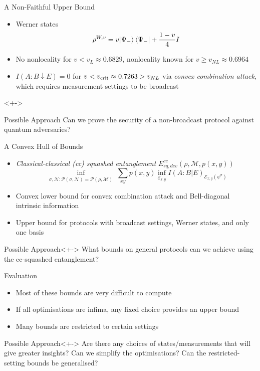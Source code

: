 \documentclass[xcolor=dvipsnames]{beamer}
\newcommand{\?}{\mathrel{?}} %
\newcommand{\sM}{\mathcal{M}}
\newcommand{\sN}{\mathcal{N}}
\newcommand{\cE}{\mathcal{E}}
\newcommand{\cP}{\mathcal{P}}
\newcommand{\crit}{\rm crit}
\begin{document}

\begin{frame}{A Non-Faithful Upper Bound}
  \begin{itemize}[<+->]
    \item Werner states
      \[ \rho^{W,v} = v{\ket{\Psi_-}\bra{\Psi_-}} + \frac{1-v}{4}I \]
    \item No nonlocality for \(v < v_L \approx 0.6829\), nonlocality known for \(v \geq v_{NL} \approx 0.6964\)
    \item \(I(A:B \downarrow E) = 0\) for \(v < v_{\crit} \approx 0.7263 > v_{NL}\) via \emph{convex combination attack}, which requires measurement settings to be broadcast
  \end{itemize}

  \begin{onlyenv}<+->
    \begin{block}{Possible Approach}
      Can we prove the security of a non-broadcast protocol against quantum adversaries?
    \end{block}
  \end{onlyenv}
\end{frame}

\begin{frame}{A Convex Hull of Bounds}
  \begin{itemize}[<+->]
    \item \emph{Classical-classical (cc) squashed entanglement} \(E^{cc}_{sq,dev}(\rho, \sM, p(x,y))\)
      \[ \inf_{\substack{\sigma, \sN : \cP(\sigma, \sN) = \cP(\rho, \sM)}} \sum_{xy} p(x,y) \inf_{\cE_{x,y}} I{(A : B|E)}_{\cE_{x,y}(\psi^{\sigma})} \]
    \item Convex lower bound for convex combination attack and Bell-diagonal intrinsic information
    \item Upper bound for protocols with broadcast settings, Werner states, and only one basis
  \end{itemize}

  \begin{block}{Possible Approach}<+->
      What bounds on general protocols can we achieve using the cc-squashed entanglement?
  \end{block}
\end{frame}

\begin{frame}{Evaluation}
  \begin{itemize}[<+->]
    \item Most of these bounds are very difficult to compute
    \item If all optimisations are infima, any fixed choice provides an upper bound
    \item Many bounds are restricted to certain settings
  \end{itemize}

  \begin{block}{Possible Approach}<+->
      Are there any choices of states/measurements that will give greater insights? Can we simplify the optimisations? Can the restricted-setting bounds be generalised?
  \end{block}
\end{frame}
\end{document}
